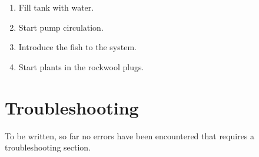 \documentclass[american,12pt]{article}
\begin{document}
\begin{enumerate}
    \item Fill tank with water.
    \item Start pump circulation.
    \item Introduce the fish to the system.
    \item Start plants in the rockwool plugs.
\end{enumerate}

\section{Troubleshooting}
To be written, so far no errors have been encountered that requires a
troubleshooting section.


\printbibliography
\end{document}
